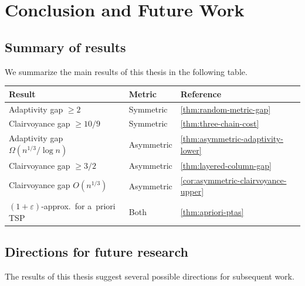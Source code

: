 \documentclass[12pt,a4paper,oneside]{report}
\begin{document}
\chapter{Conclusion and Future Work}\label{ch:conclusion}

\section{Summary of results}\label{sec:conclusion-summary}

We summarize the main results of this thesis in the following table.

\begin{center}
\small
\begin{tabular}{lll}
\toprule
\textbf{Result} & \textbf{Metric} & \textbf{Reference} \\
\midrule
Adaptivity gap $\ge 2$ & Symmetric & \cref{thm:random-metric-gap} \\
Clairvoyance gap $\ge 10/9$ & Symmetric & \cref{thm:three-chain-cost} \\
Adaptivity gap $\Omega(n^{1/3}/\log n)$ & Asymmetric & \cref{thm:asymmetric-adaptivity-lower} \\
Clairvoyance gap $\ge 3/2$ & Asymmetric & \cref{thm:layered-column-gap} \\
Clairvoyance gap $O(n^{1/3})$ & Asymmetric & \cref{cor:asymmetric-clairvoyance-upper} \\
$(1{+}\varepsilon)$-approx.\ for a~priori TSP & Both & \cref{thm:apriori-ptas} \\
\bottomrule
\end{tabular}
\end{center}

\section{Directions for future research}\label{sec:future-research}

The results of this thesis suggest several possible directions for subsequent
work.
\end{document}
